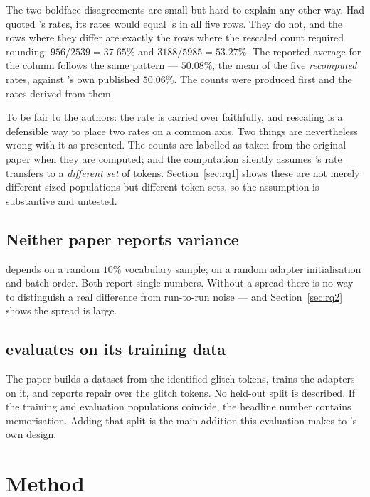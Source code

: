 The two boldface disagreements are small but hard to explain any other way. Had
\gc{} quoted \gp{}'s rates, its rates would equal \gp{}'s in all five rows. They
do not, and the rows where they differ are exactly the rows where the rescaled
count required rounding: $956/2539 = 37.65\%$ and $3188/5985 = 53.27\%$. The
reported average for the \gp{} column follows the same pattern --- $50.08\%$, the
mean of the five \emph{recomputed} rates, against \gp{}'s own published $50.06\%$.
The counts were produced first and the rates derived from them.

To be fair to the authors: the rate is carried over faithfully, and rescaling is
a defensible way to place two rates on a common axis. Two things are nevertheless
wrong with it as presented. The counts are labelled as taken from the original
paper when they are computed; and the computation silently assumes \gp{}'s rate
transfers to a \emph{different set} of tokens. Section~\ref{sec:rq1} shows these
are not merely different-sized populations but different token sets, so the
assumption is substantive and untested.

\subsection{Neither paper reports variance}

\gp{} depends on a random $10\%$ vocabulary sample; \gc{} on a random adapter
initialisation and batch order. Both report single numbers. Without a spread
there is no way to distinguish a real difference from run-to-run noise --- and
Section~\ref{sec:rq2} shows the spread is large.

\subsection{\gc{} evaluates on its training data}

The paper builds a dataset from the identified glitch tokens, trains the adapters
on it, and reports repair over the glitch tokens. No held-out split is described.
If the training and evaluation populations coincide, the headline number contains
memorisation. Adding that split is the main addition this evaluation makes to
\gc{}'s own design.

\section{Method}


